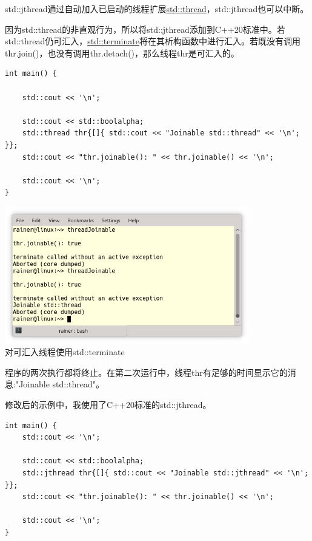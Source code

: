 
std::jthread通过自动加入已启动的线程扩展\href{https://en.cppreference.com/w/cpp/thread/thread}{std::thread}，std::jthread也可以中断。

因为std::thread的非直观行为，所以将std::jthread添加到C++20标准中。若std::thread仍可汇入，\href{https://en.cppreference.com/w/cpp/error/terminate}{std::terminate}将在其析构函数中进行汇入。若既没有调用thr.join()，也没有调用thr.detach()，那么线程thr是可汇入的。

\begin{lstlisting}[style=styleCXX]
int main() {
	
	std::cout << '\n';
	
	std::cout << std::boolalpha;
	std::thread thr{[]{ std::cout << "Joinable std::thread" << '\n'; }};
	std::cout << "thr.joinable(): " << thr.joinable() << '\n';
	
	std::cout << '\n';
}
\end{lstlisting}

\begin{center}
\includegraphics[width=0.8\textwidth]{content/2/chapter3/images/9.png}\\
对可汇入线程使用std::terminate
\end{center}

程序的两次执行都将终止。在第二次运行中，线程thr有足够的时间显示它的消息:"Joinable std::thread"。

修改后的示例中，我使用了C++20标准的std::jthread。

\begin{lstlisting}[style=styleCXX]
int main() {
	std::cout << '\n';
	
	std::cout << std::boolalpha;
	std::jthread thr{[]{ std::cout << "Joinable std::jthread" << '\n'; }};
	std::cout << "thr.joinable(): " << thr.joinable() << '\n';
	
	std::cout << '\n';
}
\end{lstlisting}

